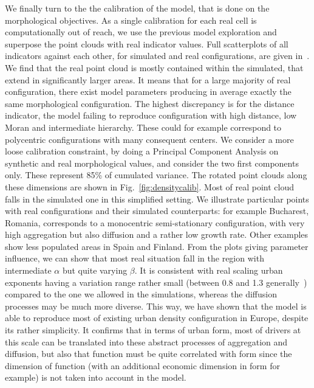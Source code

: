 \documentclass[10pt,letterpaper]{article}
\begin{document}
We finally turn to the the calibration of the model, that is done on the morphological objectives. As a single calibration for each real cell is computationally out of reach, we use the previous model exploration and superpose the point clouds with real indicator values. Full scatterplots of all indicators against each other, for simulated and real configurations, are given in~. We find that the real point cloud is mostly contained within the simulated, that extend in significantly larger areas. It means that for a large majority of real configuration, there exist model parameters producing in average exactly the same morphological configuration. The highest discrepancy is for the distance indicator, the model failing to reproduce configuration with high distance, low Moran and intermediate hierarchy. These could for example correspond to polycentric configurations with many consequent centers. We consider a more loose calibration constraint, by doing a Principal Component Analysis on synthetic and real morphological values, and consider the two first components only. These represent 85\% of cumulated variance. The rotated point clouds along these dimensions are shown in Fig.~\ref{fig:densitycalib}. Most of real point cloud falls in the simulated one in this simplified setting. We illustrate particular points with real configurations and their simulated counterparts: for example Bucharest, Romania, corresponds to a monocentric semi-stationary configuration, with very high aggregation but also diffusion and a rather low growth rate. Other examples show less populated areas in Spain and Finland. From the plots giving parameter influence, we can show that most real situation fall in the region with intermediate $\alpha$ but quite varying $\beta$. It is consistent with real scaling urban exponents having a variation range rather small (between 0.8 and 1.3 generally~\cite{pumain2006evolutionary}) compared to the one we allowed in the simulations, whereas the diffusion processes may be much more diverse. This way, we have shown that the model is able to reproduce most of existing urban density configuration in Europe, despite its rather simplicity. It confirms that in terms of urban form, most of drivers at this scale can be translated into these abstract processes of aggregation and diffusion, but also that function must be quite correlated with form since the dimension of function (with an additional economic dimension in form for example) is not taken into account in the model.
\end{document}
